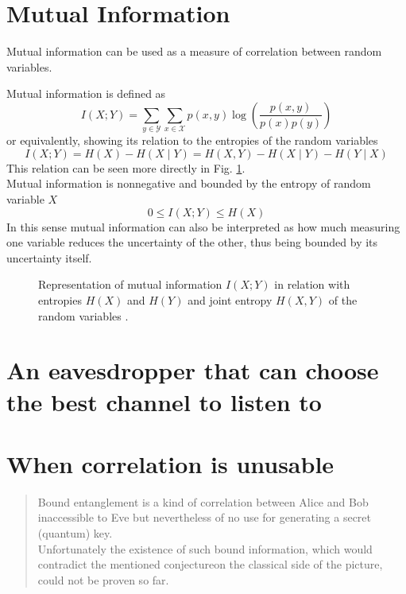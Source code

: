 \section{Mutual Information}
    Mutual information can be used as a measure of correlation between random variables. 
	
	Mutual information is defined as
	$$ I(X;Y) = \sum_{y\in\mathcal{Y}}\sum_{x\in\mathcal{X}} p(x,y) \log\left(\frac{p(x,y)}{p(x)p(y)}\right) $$
	or equivalently, showing its relation to the entropies of the random variables
	$$ I(X;Y) = H(X) - H(X\mid Y) = H(X,Y) - H(X\mid Y) - H(Y\mid X) $$
	This relation can be seen more directly in Fig. \ref{fig:mutual_info}.\\
	Mutual information is nonnegative and bounded by the entropy of random variable $X$
	$$ 0 \leq I(X;Y) \leq H(X) $$
	In this sense mutual information can also be interpreted as how much measuring one variable reduces the uncertainty of the other, thus being bounded by its uncertainty itself.
	
	\begin{figure}[h]
		\centering
		
		\caption{Representation of mutual information $I(X;Y)$ in relation with entropies $H(X)$ and $H(Y)$ and joint entropy $H(X,Y)$ of the random variables .
		\label{fig:mutual_info}}
	\end{figure}	
\section{An eavesdropper that can choose the best channel to listen to}
    \label{intrininfo}
\section{When correlation is unusable}
	\begin{quotation}
		Bound entanglement is a kind of correlation between Alice and Bob inaccessible to Eve but nevertheless of no use for generating a secret (quantum) key.\\
		Unfortunately the existence of such bound information, which would contradict the mentioned conjecture\footnotemark on the classical side of the picture, could not be proven so far.
	\end{quotation}
		

